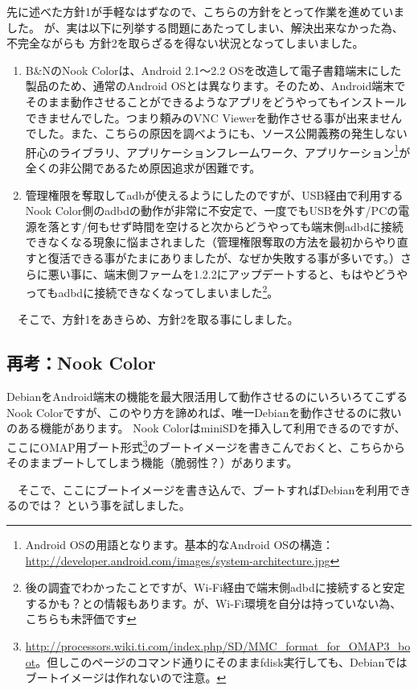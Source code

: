 \documentclass[mingoth,a4paper]{jsarticle}
\begin{document}
 先に述べた方針1が手軽なはずなので、こちらの方針をとって作業を進めていました。
が、実は以下に列挙する問題にあたってしまい、解決出来なかった為、不完全ながらも
方針2を取らざるを得ない状況となってしまいました。

\begin{enumerate}
\item B\&NのNook Colorは、Android 2.1〜2.2 OSを改造して電子書籍端末にした製品のため、通常のAndroid OSとは異なります。そのため、Android端末でそのまま動作させることができるようなアプリをどうやってもインストールできませんでした。つまり頼みのVNC Viewerを動作させる事が出来ませんでした。また、こちらの原因を調べようにも、ソース公開義務の発生しない肝心のライブラリ、アプリケーションフレームワーク、アプリケーション\footnote{Android OSの用語となります。基本的なAndroid OSの構造：\url{http://developer.android.com/images/system-architecture.jpg}}が全くの非公開であるため原因追求が困難です。
\item 管理権限を奪取してadbが使えるようにしたのですが、USB経由で利用するNook Color側のadbdの動作が非常に不安定で、一度でもUSBを外す/PCの電源を落とす/何もせず時間を空けると次からどうやっても端末側adbdに接続できなくなる現象に悩まされました（管理権限奪取の方法を最初からやり直すと復活できる事がたまにありましたが、なぜか失敗する事が多いです。）さらに悪い事に、端末側ファームを1.2.2にアップデートすると、もはやどうやってもadbdに接続できなくなってしまいました\footnote{後の調査でわかったことですが、Wi-Fi経由で端末側adbdに接続すると安定するかも？との情報もあります。が、Wi-Fi環境を自分は持っていない為、こちらも未評価です}。
\end{enumerate}

　そこで、方針1をあきらめ、方針2を取る事にしました。

\subsection{再考：Nook Color}

 DebianをAndroid端末の機能を最大限活用して動作させるのにいろいろてこずる
Nook Colorですが、このやり方を諦めれば、唯一Debianを動作させるのに救いのある機能があります。
Nook ColorはminiSDを挿入して利用できるのですが、ここにOMAP用ブート形式\footnote{\url{http://processors.wiki.ti.com/index.php/SD/MMC_format_for_OMAP3_boot}。但しこのページのコマンド通りにそのままfdisk実行しても、Debianではブートイメージは作れないので注意。}のブートイメージを書きこんでおくと、こちらからそのままブートしてしまう機能（脆弱性？）があります。

　そこで、ここにブートイメージを書き込んで、ブートすればDebianを利用できるのでは？
という事を試しました。
\end{document}
